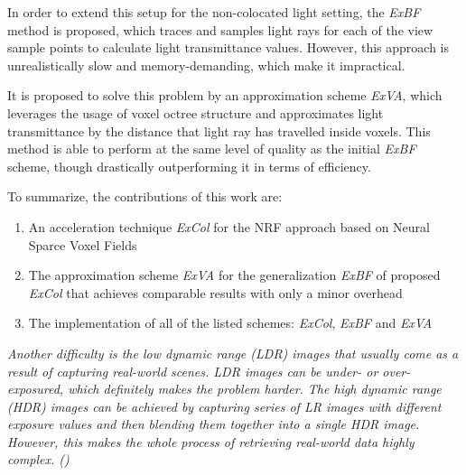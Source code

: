 In order to extend this setup for the non-colocated light setting, the \textit{ExBF} method is proposed,
which traces and samples light rays for each of the view sample points to calculate light transmittance values.
However, this approach is unrealistically slow and memory-demanding,
which make it impractical.

It is proposed to solve this problem by an approximation scheme \textit{ExVA},
which leverages the usage of voxel octree structure
and approximates light transmittance by the distance that light ray has travelled inside voxels.
This method is able to perform at the same level of quality as the initial \textit{ExBF} scheme,
though drastically outperforming it in terms of efficiency.

\textit{}
To summarize, the contributions of this work are:
\begin{enumerate}
    \item An acceleration technique \textit{ExCol} for the NRF approach
    based on Neural Sparce Voxel Fields
    \item The approximation scheme \textit{ExVA}
    for the generalization \textit{ExBF} of proposed \textit{ExCol}
    that achieves comparable results with only a minor overhead
    \item The implementation of all of the listed schemes: \textit{ExCol}, \textit{ExBF} and \textit{ExVA}
\end{enumerate}







\textit{Another difficulty is the low dynamic range (LDR) images
that usually come as a result of capturing real-world scenes.
LDR images can be under- or over-exposured, which definitely makes the problem harder.
The high dynamic range (HDR) images can be achieved
by capturing series of LR images with different exposure values
and then blending them together into a single HDR image.
However, this makes the whole process of retrieving real-world data highly complex. ()}




